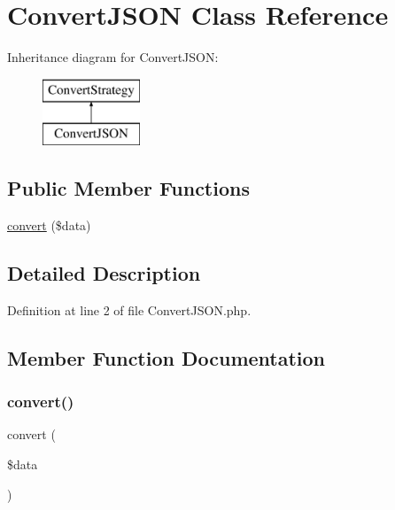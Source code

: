 \hypertarget{class_convert_j_s_o_n}{}\section{Convert\+J\+S\+ON Class Reference}
\label{class_convert_j_s_o_n}
Inheritance diagram for Convert\+J\+S\+ON\+:\begin{figure}[H]
\begin{center}
\leavevmode
\includegraphics[height=2.000000cm]{class_convert_j_s_o_n}
\end{center}
\end{figure}
\subsection*{Public Member Functions}
\begin{DoxyCompactItemize}
\item 
\hyperlink{class_convert_j_s_o_n_a41444ea294bbd35a6c07ef4e9faeae10}{convert} (\$data)
\end{DoxyCompactItemize}


\subsection{Detailed Description}


Definition at line 2 of file Convert\+J\+S\+O\+N.\+php.



\subsection{Member Function Documentation}
\hypertarget{class_convert_j_s_o_n_a41444ea294bbd35a6c07ef4e9faeae10}{}\label{class_convert_j_s_o_n_a41444ea294bbd35a6c07ef4e9faeae10} 
\subsubsection{\texorpdfstring{convert()}{convert()}}
{\footnotesize\ttfamily convert (\begin{DoxyParamCaption}\item[{}]{\$data }\end{DoxyParamCaption})}

